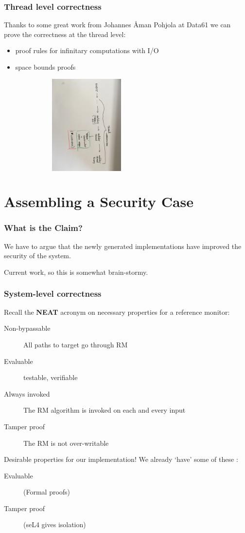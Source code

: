 \documentclass{beamer}
\begin{document}
\begin{frame}[fragile]\frametitle{Thread level correctness}

Thanks to some great work from Johannes {\AA}man Pohjola at Data61 we
can prove the correctness at the thread level:

\begin{itemize}
\item proof rules for infinitary computations with I/O
\item space bounds proofs
\end{itemize}

\includegraphics[width=90mm,height=50mm]{thread.jpg}

\end{frame}

\section {Assembling a Security Case}

\begin{frame}\frametitle{What is the Claim?}

 We have to argue that the newly generated implementations have
 improved the security of the system.

 Current work, so this is somewhat brain-stormy.

\end{frame}


\begin{frame}\frametitle{System-level correctness}

Recall the \textbf{NEAT} acronym on necessary properties for a reference monitor:

\begin{description}
\item [Non-bypassable] All paths to target go through RM
\item [Evaluable] testable, verifiable
\item [Always invoked] The RM algorithm is invoked on each and every input
\item [Tamper proof] The RM is not over-writable
\end{description}

\noindent Desirable properties for our implementation! We already
`have' some of these :

\begin{description}
   \item [Evaluable] (Formal proofs)
   \item [Tamper proof] (seL4 gives isolation)
\end{description}

\end{frame}
\end{document}
